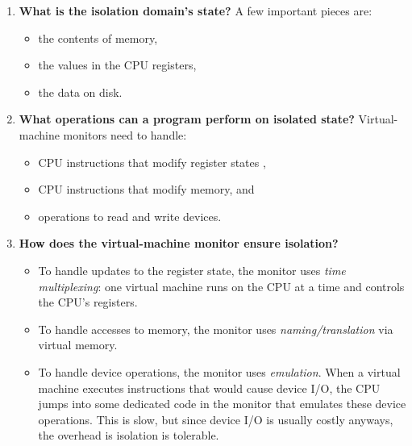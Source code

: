 \begin{enumerate}
  \item \textbf{What is the isolation domain's state?}
        A few important pieces are:
        \begin{itemize}
          \item the contents of memory,
          \item the values in the CPU registers,
          \item the data on disk.
        \end{itemize}

\item \textbf{What operations can a program perform on isolated state?}
        Virtual-machine monitors need to handle: 
        \begin{itemize}
          \item CPU instructions that modify register states ,
          \item CPU instructions that modify memory, and
          \item operations to read and write devices.
        \end{itemize}


\item \textbf{How does the virtual-machine monitor ensure isolation?}
        \begin{itemize}
          \item To handle updates to the register state, the monitor
                uses \emph{time multiplexing}: one virtual machine
                runs on the CPU at a time and controls the
                CPU's registers.
          \item To handle accesses to memory, the monitor uses
                \emph{naming/translation} via virtual memory.
          \item To handle device operations, the monitor uses 
                \emph{emulation}.
                When a virtual machine executes instructions that
                would cause device I/O, the CPU jumps into some dedicated
                code in the monitor that emulates these device operations.
                This is slow, but since device I/O is usually costly
                anyways, the overhead is isolation is tolerable.
        \end{itemize}
  
\end{enumerate}

